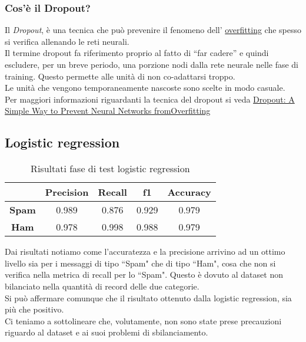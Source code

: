 \subsubsection{Cos'è il Dropout?}
Il \textit{Dropout}, è una tecnica che può prevenire il fenomeno dell' \href{https://en.wikipedia.org/wiki/Overfitting}{overfitting} che spesso si verifica allenando le reti neurali.\\
Il termine dropout fa riferimento proprio al fatto di ``far cadere'' e quindi escludere, per un breve periodo, una porzione nodi dalla rete neurale nelle fase di training. Questo permette alle unità di non co-adattarsi troppo.\\
Le unità che vengono temporaneamente nascoste sono scelte in modo casuale.\\
Per maggiori informazioni riguardanti la tecnica del dropout si 
veda \href{http://www.jmlr.org/papers/volume15/srivastava14a/srivastava14a.pdf}{Dropout: A Simple Way to Prevent Neural Networks fromOverfitting}
\subsection{Logistic regression}
\renewcommand{\arraystretch}{1.4}
\begin{table}[H]
	\begin{center}
		\begin{tabular}{|c|c|c|c|c|}
			\hline
			&\textbf{Precision} & \textbf{Recall} & \textbf{f1} & \textbf{Accuracy}\\ \hline
			\textbf{Spam} & 0.989  & 0.876 & 0.929 & 0.979 \\ \hline
			\textbf{Ham} & 0.978  & 0.998 & 0.988 & 0.979\\ \hline
		\end{tabular}
		\caption{Risultati fase di test logistic regression\label{}}
	\end{center}
\end{table}
\renewcommand{\arraystretch}{1}
Dai risultati notiamo come l'accuratezza e la precisione arrivino ad un ottimo livello sia per i messaggi di tipo ``Spam" che di tipo ``Ham", cosa che non si verifica nella metrica di recall per lo ``Spam". Questo è dovuto al dataset non bilanciato nella quantità di record delle due categorie. \\
Si può affermare comunque che il risultato ottenuto dalla logistic regression, sia più che positivo.\\
Ci teniamo a sottolineare che, volutamente, non sono state prese precauzioni riguardo al dataset e ai suoi problemi di sbilanciamento.